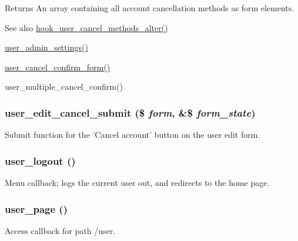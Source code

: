 \begin{DoxyReturn}{Returns}
An array containing all account cancellation methods as form elements.
\end{DoxyReturn}
\begin{DoxySeeAlso}{See also}
\hyperlink{group__hooks_gadbac37235bb01361bf8b3d375ea417a5}{hook\_\-user\_\-cancel\_\-methods\_\-alter()} 

\hyperlink{group__forms_ga8cb1bc70278e0e628fd17c2ec8353bd1}{user\_\-admin\_\-settings()} 

\hyperlink{group__forms_ga75a9df042449e7fc294c418083052114}{user\_\-cancel\_\-confirm\_\-form()} 

user\_\-multiple\_\-cancel\_\-confirm() 
\end{DoxySeeAlso}
\hypertarget{user_8pages_8inc_a6912a7bb727cd64eb073d3cd1de643b0}{
\subsubsection[{user\_\-edit\_\-cancel\_\-submit}]{\setlength{\rightskip}{0pt plus 5cm}user\_\-edit\_\-cancel\_\-submit (\$ {\em form}, \/  \&\$ {\em form\_\-state})}}
\label{user_8pages_8inc_a6912a7bb727cd64eb073d3cd1de643b0}
Submit function for the 'Cancel account' button on the user edit form. \hypertarget{user_8pages_8inc_a239a2e50f18165d4a8b4c8bd3917466e}{
\subsubsection[{user\_\-logout}]{\setlength{\rightskip}{0pt plus 5cm}user\_\-logout ()}}
\label{user_8pages_8inc_a239a2e50f18165d4a8b4c8bd3917466e}
Menu callback; logs the current user out, and redirects to the home page. \hypertarget{user_8pages_8inc_aac56f8d931a31fe423974228cec2cf57}{
\subsubsection[{user\_\-page}]{\setlength{\rightskip}{0pt plus 5cm}user\_\-page ()}}
\label{user_8pages_8inc_aac56f8d931a31fe423974228cec2cf57}
Access callback for path /user.

